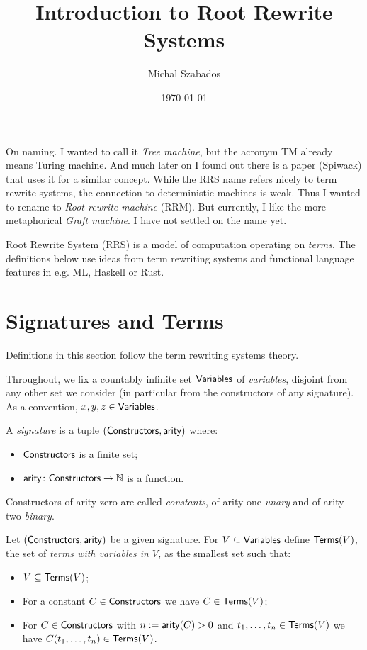 \documentclass[11pt]{article}
\title{Introduction to Root Rewrite Systems}
\author{Michal Szabados}
\date{\today}
\begin{document}
\maketitle

\begin{note}
On naming. I wanted to call it \emph{Tree machine}, but the acronym
TM already means Turing machine. And much later on I found out there is
a paper (Spiwack) that uses it for a similar concept. While the RRS name
refers nicely to term rewrite systems, the connection to deterministic machines
is weak. Thus I wanted to rename to \emph{Root rewrite machine} (RRM). But
currently, I like the more metaphorical \emph{Graft machine}. I have not settled
on the name yet.
\end{note}

Root Rewrite System (RRS) is a model of computation operating on \emph{terms}. The
definitions below use ideas from term rewriting systems and functional
language features in e.g. ML, Haskell or Rust.

\section{Signatures and Terms}

Definitions in this section follow the term rewriting systems theory.

Throughout, we fix a countably infinite set $\mathsf{Variables}$ of \emph{variables},
disjoint from any other set we consider (in particular from the constructors of
any signature). As a convention, $x, y, z \in \mathsf{Variables}$.

\begin{definition}[Signature]
A \emph{signature} is a tuple $(\mathsf{Constructors}, \mathsf{arity})$ where:
\begin{itemize}
  \item $\mathsf{Constructors}$ is a finite set;
  \item $\mathsf{arity} \colon \mathsf{Constructors} \to \mathbb{N}$ is a function.
\end{itemize}
Constructors of arity zero are called \emph{constants}, of arity one
\emph{unary} and of arity two \emph{binary}.
\end{definition}

\begin{definition}[Terms]
Let $(\mathsf{Constructors}, \mathsf{arity})$ be a given signature. For $V \subseteq \mathsf{Variables}$ define $\mathsf{Terms}(V)$, the set of
\emph{terms with variables in $V$,} as the smallest set such that:
\begin{itemize}
  \item $V \subseteq \mathsf{Terms}(V)$;
  \item For a constant $C \in \mathsf{Constructors}$ we have $C \in \mathsf{Terms}(V)$;
  \item For $C \in \mathsf{Constructors}$ with $n := \mathsf{arity}(C) > 0$ and $t_1, \dots, t_n \in \mathsf{Terms}(V)$
        we have $C(t_1, \dots, t_n) \in \mathsf{Terms}(V)$.
\end{itemize}
\end{definition}
\end{document}

